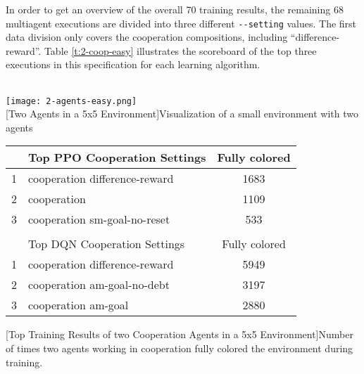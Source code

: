 In order to get an overview of the overall 70 training results, the remaining 68 multiagent executions are divided into three different \verb|--setting| values. The first data division only covers the cooperation compositions, including ``difference-reward''. Table \ref{t:2-coop-easy} illustrates the scoreboard of the top three executions in this specification for each learning algorithm. \\\\

\begin{minipage}{\textwidth}
  \begin{minipage}[b]{0.29\textwidth}
    \centering
    \texttt{[image: 2-agents-easy.png]}\\
    [Two Agents in a 5x5 Environment]{Visualization of a small environment with two agents}\label{fig:2-coop-easy}
  \end{minipage}
  \hfill
    \begin{minipage}[b]{0.69\textwidth}
    \centering
    \begin{tabular}{clc}\hline
         & Top PPO Cooperation Settings & Fully colored \\ \hline
        {\small 1} & cooperation difference-reward & 1683 \\
        {\small 2} & cooperation & 1109 \\
        {\small 3} & cooperation sm-goal-no-reset & 533 \\ \hline
         &   \\ \hline
         & Top DQN Cooperation Settings & Fully colored \\ \hline
        {\small 1} & cooperation difference-reward & 5949 \\
        {\small 2} & cooperation am-goal-no-debt & 3197 \\
        {\small 3} & cooperation am-goal & 2880 \\ \hline
        \end{tabular}
        [Top Training Results of two Cooperation Agents in a 5x5 Environment]{Number of times two agents working in cooperation fully colored the environment during training.\\}\label{t:2-coop-easy}
    \end{minipage}
  \end{minipage}\\\\

